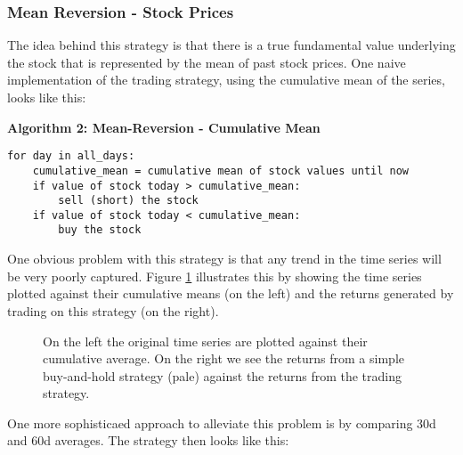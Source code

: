 \subsubsection{Mean Reversion - Stock Prices}
The idea behind this strategy is that there is a true fundamental value underlying the stock that is represented by the mean of past stock prices. One naive implementation of the trading strategy, using the cumulative mean of the series, looks like this: 

\vspace{2ex}
\textbf{\small{Algorithm 2: Mean-Reversion - Cumulative Mean}}
\vspace{-1ex}
\begin{verbatim}
for day in all_days: 
    cumulative_mean = cumulative mean of stock values until now
    if value of stock today > cumulative_mean:
        sell (short) the stock
    if value of stock today < cumulative_mean:
        buy the stock
\end{verbatim}

One obvious problem with this strategy is that any trend in the time series will be very poorly captured. Figure \ref{fig:mean_reversion_cum_mean} illustrates this by showing the time series plotted against their cumulative means (on the left) and the returns generated by trading on this strategy (on the right). 
\begin{figure}[h!]
    \centering
    \begin{minipage}[b]{0.49\textwidth}
        \centering
            \begin{adjustbox}{width=\textwidth,center, scale={1}{0.9}}
                
            \end{adjustbox}
    \end{minipage}
    \hfill
    \begin{minipage}[b]{0.49\textwidth}
        \centering
        \begin{adjustbox}{width=\textwidth,center, scale={1}{1.2}}
            
        \end{adjustbox}
    \end{minipage}
    \caption{On the left the original time series are plotted against their cumulative average. On the right we see the returns from a simple buy-and-hold strategy (pale) against the returns from the trading strategy.}
    \label{fig:mean_reversion_cum_mean}
\end{figure}{}
One more sophisticaed approach to alleviate this problem is by comparing 30d and 60d averages. The strategy then looks like this: 

